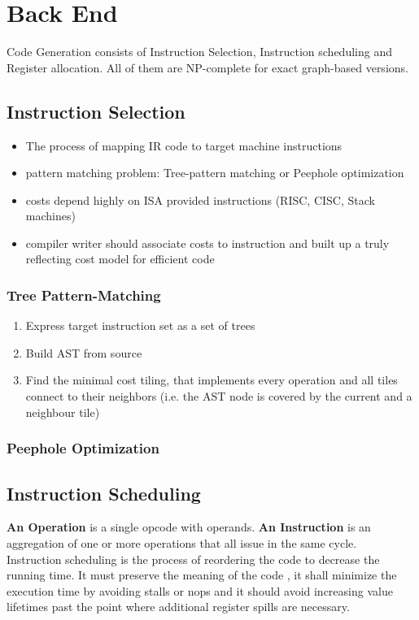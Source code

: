 \chapter{Back End}
Code Generation consists of Instruction Selection, Instruction scheduling and Register allocation. All of them are NP-complete for exact graph-based versions.
\section{Instruction Selection}
\begin{itemize}
	\item The process of mapping IR code to target machine instructions
	\item pattern matching problem: Tree-pattern matching or Peephole optimization
	\item costs depend highly on ISA provided instructions (RISC, CISC, Stack machines)
	\item compiler writer should associate costs to instruction and built up a truly reflecting cost model for efficient code
\end{itemize}

\subsection{Tree Pattern-Matching}
\begin{enumerate}
	\item Express target instruction set as a set of trees
	\item Build AST from source
	\item Find the minimal cost tiling, that implements every operation and all tiles connect to their neighbors (i.e. the AST node is covered by the current and a neighbour tile)
\end{enumerate}

\subsection{Peephole Optimization}

\section{Instruction Scheduling}
\textbf{An Operation} is a single opcode with operands. \textbf{An Instruction} is an aggregation of one or more operations that all issue in the same cycle. \\
Instruction scheduling is the process of reordering the code to decrease the running time. It must preserve the meaning of the code , it shall minimize the execution time by avoiding stalls or nops and it should avoid increasing value lifetimes past the point where additional register spills are necessary.

